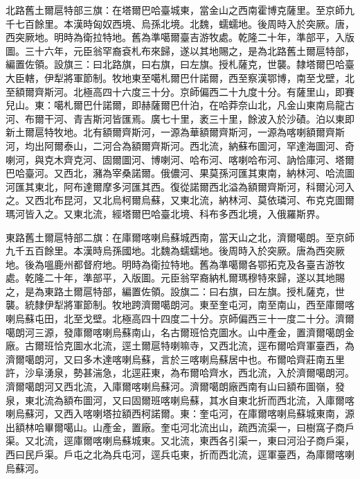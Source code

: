 \begin{pinyinscope}
北路舊土爾扈特部三旗：在塔爾巴哈臺城東，當金山之西南霍博克薩里。至京師九千七百餘里。本漢時匈奴西境、烏孫北境。北魏，蠕蠕地。後周時入於突厥。唐，西突厥地。明時為衛拉特地。舊為準噶爾臺吉游牧處。乾隆二十年，準部平，入版圖。三十六年，元臣翁罕裔袞札布來歸，遂以其地賜之，是為北路舊土爾扈特部，編置佐領。設旗三：曰北路旗，曰右旗，曰左旗。授札薩克，世襲。隸塔爾巴哈臺大臣轄，伊犁將軍節制。牧地東至噶札爾巴什諾爾，西至察漢鄂博，南至戈壁，北至額爾齊斯河。北極高四十六度三十分。京師偏西二十九度十分。有薩里山，即賽兒山。東：噶札爾巴什諾爾，即赫薩爾巴什泊，在哈莽奈山北，凡金山東南烏龍古河、布爾干河、青吉斯河皆匯焉。廣七十里，袤三十里，餘波入於沙磧。泊以東即新土爾扈特牧地。北有額爾齊斯河，一源為華額爾齊斯河，一源為喀喇額爾齊斯河，均出阿爾泰山，二河合為額爾齊斯河。西北流，納蘇布圖河，罕達海圖河、奇喇河，與克木齊克河、固爾圖河、博喇河、哈布河、喀喇哈布河、訥恰庫河、塔爾巴哈臺河。又西北，瀦為宰桑諾爾。俄儂河、果莫孫河匯其東南，納林河、哈流圖河匯其東北，阿布達爾摩多河匯其西。復從諾爾西北溢為額爾齊斯河，科爾沁河入之。又西北布昆河，又北烏柯爾烏蘇，又東北流，納林河、莫依璘河、布克克圖爾瑪河皆入之。又東北流，經塔爾巴哈臺北境、科布多西北境，入俄羅斯界。

東路舊土爾扈特部二旗：在庫爾喀喇烏蘇城西南，當天山之北，濟爾噶朗。至京師九千五百餘里。本漢時烏孫國地。北魏為蠕蠕地。後周時入於突厥。唐為西突厥地。後為嗢鹿州都督府地。明時為衛拉特地。舊為準噶爾各鄂拓克及各臺吉游牧處。乾隆二十年，準部平，入版圖。元臣翁罕裔納札爾瑪穆特來歸，遂以其地賜之，是為東路土爾扈特部，編置佐領。設旗二：曰右旗，曰左旗。授札薩克，世襲。統隸伊犁將軍節制。牧地跨濟爾噶朗河。東至奎屯河，南至南山，西至庫爾喀喇烏蘇屯田，北至戈壁。北極高四十四度二十分。京師偏西三十一度二十分。濟爾噶朗河三源，發庫爾喀喇烏蘇南山，名古爾班恰克圖水。山中產金，置濟爾噶朗金廠。古爾班恰克圖水北流，逕土爾扈特喇嘛寺，又西北流，逕布爾哈齊軍臺西，為濟爾噶朗河，又曰多木達喀喇烏蘇，言於三喀喇烏蘇居中也。布爾哈齊莊南五里許，沙阜湧泉，勢甚湍急，北逕莊東，為布爾哈齊水，西北流，入於濟爾噶朗河。濟爾噶朗河又西北流，入庫爾喀喇烏蘇河。濟爾噶朗廠西南有山曰額布圖嶺，發泉，東北流為額布圖河，又曰固爾班喀喇烏蘇，其水自東北折而西北流，入庫爾喀喇烏蘇河，又西入喀喇塔拉額西柯諾爾。東：奎屯河，在庫爾喀喇烏蘇城東南，源出額林哈畢爾噶山。山產金，置廠。奎屯河北流出山，疏西流渠一，曰樹窩子商戶渠。又北流，逕庫爾喀喇烏蘇城東。又北流，東西各引渠一，東曰河沿子商戶渠，西曰民戶渠。戶屯之北為兵屯河，逕兵屯東，折而西北流，逕軍臺西，為庫爾喀喇烏蘇河。


\end{pinyinscope}
